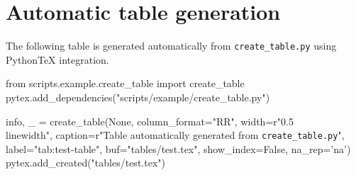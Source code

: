\section{Automatic table generation}

The following table is generated automatically from \texttt{create\_table.py} using Python\TeX{} integration.

\begin{pycode}
from scripts.example.create_table import create_table
pytex.add_dependencies("scripts/example/create_table.py")

info, _ = create_table(None,
                       column_format="RR",
                       width=r"0.5\\linewidth",
                       caption=r"Table automatically generated from \texttt{create\_table.py}",
                       label="tab:test-table",
                       buf="tables/test.tex",
                       show_index=False,
                       na_rep='na')
pytex.add_created("tables/test.tex")
\end{pycode}

